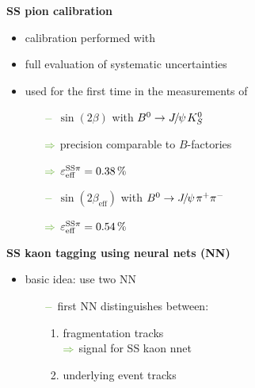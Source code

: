 {\begin{minipage}{0.474\boxwidth}
\vspace{0.1em}

\textbf{SS pion calibration}
\vspace{-0.1em}
\begin{itemize}
\setlength\itemsep{0.01em}
\item calibration performed with \BdToJPsiKst
\item full evaluation of systematic uncertainties 
\item used for the first time in the measurements of
\begin{itemize}
\setlength{\itemindent}{-.11in}
\item[${\color{tu_gruen}-}$] $\sin(2\beta)$ with $\Bd \rightarrow \jpsi K_S^0$
\setlength{\itemindent}{.05in}
\item[${\color{tu_gruen}\Rightarrow}$] precision comparable to $B$-factories
\item[${\color{tu_gruen}\Rightarrow}$] $\varepsilon_{\text{eff}}^{\text{SS}\pi} = 0.38\,\%$
\setlength{\itemindent}{-.11in}
\item[${\color{tu_gruen}-}$] $\sin(2\beta_{\text{eff}})$ with $\Bd \rightarrow \jpsi \pi^+ \pi^-$
\setlength{\itemindent}{.05in}
\item[${\color{tu_gruen}\Rightarrow}$] $\varepsilon_{\text{eff}}^{\text{SS}\pi} = 0.54\,\%$
\end{itemize}

\end{itemize}
\end{minipage}
\vspace{0.3em}
\hfill
\begin{minipage}{0.474\boxwidth}
\vspace{0.1em}
\textbf{SS kaon tagging using neural nets (NN)}
\vspace{-0.1em}

\begin{itemize}
\item basic idea: use two NN
	\begin{itemize}
	\setlength\itemsep{0.01em}
	\setlength{\itemindent}{-.11in}
	\item[${\color{tu_gruen}-}$] first NN distinguishes between:
		\begin{enumerate}
		\item fragmentation tracks\\
		${\color{tu_gruen}\Rightarrow}$ signal for SS kaon nnet
		\item underlying event tracks 
		\end{enumerate}
	\end{itemize}
\vspace{-1.7em}


\end{itemize}
\end{minipage}}
